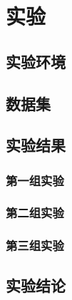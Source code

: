 \cleardoublepage

\section{实验}
\subsection{实验环境}
\subsection{数据集}
\subsection{实验结果}
\subsubsection{第一组实验}
\subsubsection{第二组实验}
\subsubsection{第三组实验}
\subsection{实验结论}